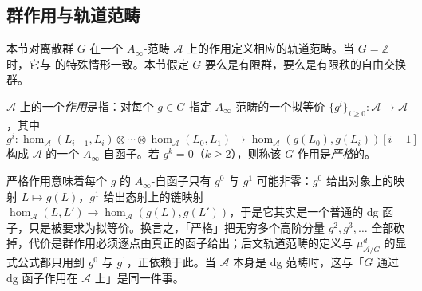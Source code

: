 \subsection{群作用与轨道范畴}
本节对离散群 $G$ 在一个 $A_{\infty}$-范畴 $\mathcal{A}$ 上的作用定义相应的轨道范畴。当 $G=\mathbb{Z}$ 时，它与 \cite{FKQ24} 的特殊情形一致。本节假定 $G$ 要么是有限群，要么是有限秩的自由交换群。
\begin{dfn}
    $\mathcal{A}$ 上的一个\emph{作用}是指：对每个 $g\in G$ 指定 $A_{\infty}$-范畴的一个拟等价 $\{g^i\}_{i\geq 0}\colon\mathcal{A}\to\mathcal{A}$，其中 \[
    g^i\colon\hom_{\mathcal{A}} (L_{i-1}, L_i)\otimes\dotsb\otimes\hom_{\mathcal{A}} (L_0, L_1)\to\hom_{\mathcal{A}} (g(L_0),g(L_i))[i-1]
    \] 构成 $\mathcal{A}$ 的一个 $A_{\infty}$-自函子。若 $g^k =0$（$k\geq 2$），则称该 $G$-作用是\emph{严格}的。
\end{dfn}

\begin{yizhu}[严格作用]
严格作用意味着每个 $g$ 的 $A_{\infty}$-自函子只有 $g^0$ 与 $g^1$ 可能非零：$g^0$ 给出对象上的映射 $L\mapsto g(L)$，$g^1$ 给出态射上的链映射 $\hom_{\mathcal{A}}(L,L')\to\hom_{\mathcal{A}}(g(L),g(L'))$，于是它其实是一个普通的 dg 函子，只是被要求为拟等价。换言之，「严格」把无穷多个高阶分量 $g^2,g^3,\dots$ 全部砍掉，代价是群作用必须逐点由真正的函子给出；后文轨道范畴的定义与 $\mu^d_{\mathcal{A}/G}$ 的显式公式都只用到 $g^0$ 与 $g^1$，正依赖于此。当 $\mathcal{A}$ 本身是 dg 范畴时，这与「$G$ 通过 dg 函子作用在 $\mathcal{A}$ 上」是同一件事。
\end{yizhu}

